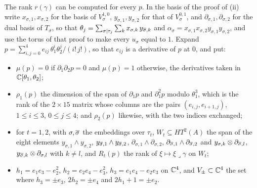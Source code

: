 The rank $r(\gamma)$ can be computed for every $p$. In the basis of the
proof of (ii) write $x_{\sigma,1},x_{\sigma,2}$ for
the basis of $V_{\sigma}^{1,0}$, $y_{\sigma,1},y_{\sigma,2}$ for that of
$V_{\sigma}^{0,1}$, and $\partial_{\sigma,1},\partial_{\sigma,2}$ for the dual
basis of $T_{\sigma}$, so that $\theta_{j}=\sum_{\sigma|\tau_{j}}\sum_{k}
x_{\sigma,k}\,y_{\overline{\sigma},k}$ and $\alpha_{\sigma}=x_{\sigma,1}x_{\sigma,2}
y_{\sigma,1}y_{\sigma,2}$, and use the torus of that proof to make every
$u_{\sigma}$ equal to $1$. Expand
$p=\sum_{i,j=0}^{4}e_{ij}\,\theta_{1}^{i}\theta_{2}^{j}/(i!\,j!)$, so that
$e_{ij}$ is a derivative of $p$ at $0$, and put:
\begin{itemize}[leftmargin=1.6em,itemsep=1pt]
\item $\mu(p)=0$ if $\partial_{1}\partial_{2}p=0$ and $\mu(p)=1$ otherwise,
  the derivatives taken in $\mathbb{C}[\theta_{1},\theta_{2}]$;
\item $\rho_{1}(p)$ the dimension of the span of $\partial_{1}p$ and
  $\partial_{1}^{2}p$ modulo $\theta_{1}^{3}$, which is the rank of the
  $2\times15$ matrix whose columns are the pairs $(e_{i,j},e_{i+1,j})$,
  $1\le i\le3$, $0\le j\le4$; and $\rho_{2}(p)$ likewise, with the two indices
  exchanged;
\item for $t=1,2$, with $\sigma,\overline{\sigma}$ the embeddings over $\tau_{t}$,
  $W_{t}\subseteq HT^{2}(A)$ the span of the eight elements
  $y_{\sigma,1}\wedge y_{\sigma,2}$, $y_{\overline{\sigma},1}\wedge
  y_{\overline{\sigma},2}$, $\partial_{\sigma,1}\wedge\partial_{\sigma,2}$,
  $\partial_{\overline{\sigma},1}\wedge\partial_{\overline{\sigma},2}$ and
  $y_{\sigma,k}\otimes\partial_{\overline{\sigma},l}$,
  $y_{\overline{\sigma},k}\otimes\partial_{\sigma,l}$ with $k\ne l$, and $R_{t}(p)$
  the rank of $\xi\mapsto\xi\lrcorner\gamma$ on $W_{t}$;
\item $h_{1}=e_{1}e_{3}-e_{2}^{2}$, $h_{2}=e_{2}e_{4}-e_{3}^{2}$,
  $h_{3}=e_{1}e_{4}-e_{2}e_{3}$ on $\mathbb{C}^{4}$, and $V_{\pm}\subset\mathbb{C}^{4}$ the
  set where $h_{3}=\pm e_{3}$, $2h_{2}=\pm e_{4}$ and $2h_{1}+1=\pm e_{2}$.
\end{itemize}

